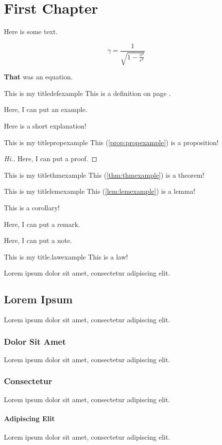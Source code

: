 \chapter{First Chapter}

Here is some text.

\[
    \gamma = \frac{1}{\sqrt{1-\frac{v^2}{c^2}}}
\]

\textbf{That} was an equation.

\begin{definition}{This is my title}{defexample}
    This is a definition on page \pageref{def:defexample}.
\end{definition}

\begin{eg}
    Here, I can put an example.
\end{eg}
\begin{explanation}
    Here is a short explanation!
\end{explanation}
\begin{prop}{This is my title}{propexample}
    This (\ref{prop:propexample}) is a proposition! 
\end{prop}
\begin{proof}[Hi.]
    Here, I can put a proof.  
\end{proof}
\begin{theorem}{This is my title}{thmexample}
    This (\ref{thm:thmexample}) is a theorem! 
\end{theorem}
\begin{lemma}{This is my title}{lemexample}
    This (\ref{lem:lemexample}) is a lemma! 
\end{lemma}
\begin{corollary}
    This is a corollary!
\end{corollary}
\begin{remark}
    Here, I can put a remark.
\end{remark}
\begin{note}
    Here, I can put a note.
\end{note}

\begin{law}{This is my title.}{lawexample}
    This is a law!
\end{law}

Lorem ipsum dolor sit amet, consectetur adipiscing elit.
\section{Lorem Ipsum}
Lorem ipsum dolor sit amet, consectetur adipiscing elit.
\subsection{Dolor Sit Amet}
Lorem ipsum dolor sit amet, consectetur adipiscing elit.
\subsection{Consectetur}
Lorem ipsum dolor sit amet, consectetur adipiscing elit.
\subsubsection{Adipiscing Elit}
Lorem ipsum dolor sit amet, consectetur adipiscing elit.
